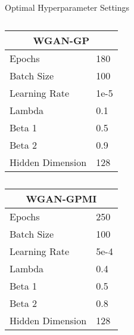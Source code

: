 \begin{table}[!htb]
	\centering
	\caption{Optimal Hyperparameter Settings}
	\label{tab:params}
	\begin{subtable}{.5\linewidth}
		\centering
		\caption{}
		\begin{tabular}{l|l}
			\hline
			\multicolumn{2}{c}{\textbf{WGAN-GP}} \\ 
			\hline
			Epochs & 180 \\
			Batch Size & 100 \\
			Learning Rate & 1e-5 \\
			Lambda & 0.1 \\
			Beta 1 & 0.5 \\
			Beta 2 & 0.9 \\
			Hidden Dimension & 128                  
		\end{tabular}
	\end{subtable}%
	\begin{subtable}{.5\linewidth}
		\centering
		\caption{}
		\begin{tabular}{l|l}
			\hline
			\multicolumn{2}{c}{\textbf{ WGAN-GPMI}} \\ 
			\hline
			Epochs & 250 \\
			Batch Size & 100 \\
			Learning Rate & 5e-4 \\
			Lambda & 0.4 \\
			Beta 1 & 0.5 \\
			Beta 2 & 0.8 \\
			Hidden Dimension & 128                  
		\end{tabular}
	\end{subtable}%
\end{table}